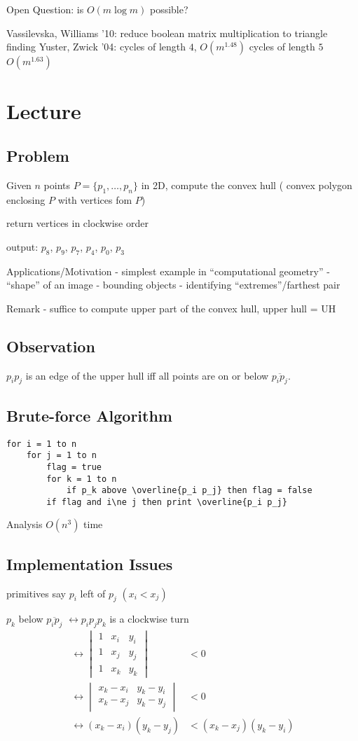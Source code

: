 \documentclass[english,12pt]{article}
\theoremstyle{plain}
\theoremstyle{definition}
\theoremstyle{definition} %
\begin{document}
Open Question: is $O(m\log m)$ possible?

Vassilevska, Williams '10: reduce boolean matrix multiplication to triangle finding
Yuster, Zwick '04: cycles of length $4$, $O(m^{1.48})$
cycles of length $5$
$O(m^{1.63})$

\section{Lecture}
\subsection{Problem}
Given $n$ points $P=\{p_1,\ldots, p_n\}$ in 2D, compute the convex hull ( convex polygon enclosing $P$ with vertices fom $P$)

return vertices in clockwise order

output: $p_8$, $p_9$, $p_7$, $p_4$, $p_0$, $p_3$

Applications/Motivation
- simplest example in ``computational geometry''
- ``shape'' of an image
- bounding objects
- identifying ``extremes''/farthest pair

Remark - suffice to compute upper part of the convex hull, upper hull = UH

\subsection{Observation}
$p_i p_j$ is an edge of the upper hull iff all points are on or below $\overline{p_ip_j}$.

\subsection{Brute-force Algorithm}
\begin{verbatim}
for i = 1 to n
    for j = 1 to n
        flag = true
        for k = 1 to n
            if p_k above \overline{p_i p_j} then flag = false
        if flag and i\ne j then print \overline{p_i p_j}
\end{verbatim}
Analysis $O(n^3)$ time

\subsection{Implementation Issues}
primitives
say $p_i$ left of $p_j$ $(x_i<x_j)$

$p_k$ below $\overline{p_i p_j}$
$\leftrightarrow p_ip_jp_k$ is a clockwise turn
\begin{align*}
\leftrightarrow
\begin{vmatrix}
1 & x_i & y_i\\
1 & x_j & y_j\\
1 & x_k & y_k
\end{vmatrix}
&<0\\
\leftrightarrow
\begin{vmatrix}
x_k-x_i & y_k - y_i\\
x_k-x_j & y_k-y_j
\end{vmatrix}
&<0\\
\leftrightarrow
(x_k-x_i)(y_k-y_j)&<(x_k-x_j)(y_k-y_i)
\end{align*}
\end{document}
